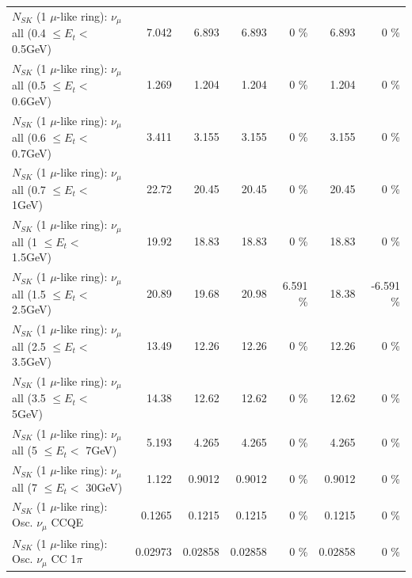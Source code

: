 \begin{table}
\begin{tabular}{| l | r | r | r  r | r  r |}
       $N_{SK}$ (1 $\mu$-like ring): $\nu_{\mu}$ all (0.4 $\leq E_{t} <$ 0.5GeV) &           7.042 &           6.893 &           6.893 &        0 \%  &           6.893 &        0 \%  \\ 
       $N_{SK}$ (1 $\mu$-like ring): $\nu_{\mu}$ all (0.5 $\leq E_{t} <$ 0.6GeV) &           1.269 &           1.204 &           1.204 &        0 \%  &           1.204 &        0 \%  \\ 
       $N_{SK}$ (1 $\mu$-like ring): $\nu_{\mu}$ all (0.6 $\leq E_{t} <$ 0.7GeV) &           3.411 &           3.155 &           3.155 &        0 \%  &           3.155 &        0 \%  \\ 
         $N_{SK}$ (1 $\mu$-like ring): $\nu_{\mu}$ all (0.7 $\leq E_{t} <$ 1GeV) &           22.72 &           20.45 &           20.45 &        0 \%  &           20.45 &        0 \%  \\ 
         $N_{SK}$ (1 $\mu$-like ring): $\nu_{\mu}$ all (1 $\leq E_{t} <$ 1.5GeV) &           19.92 &           18.83 &           18.83 &        0 \%  &           18.83 &        0 \%  \\ 
       $N_{SK}$ (1 $\mu$-like ring): $\nu_{\mu}$ all (1.5 $\leq E_{t} <$ 2.5GeV) &           20.89 &           19.68 &           20.98 &    6.591 \%  &           18.38 &   -6.591 \%  \\ 
       $N_{SK}$ (1 $\mu$-like ring): $\nu_{\mu}$ all (2.5 $\leq E_{t} <$ 3.5GeV) &           13.49 &           12.26 &           12.26 &        0 \%  &           12.26 &        0 \%  \\ 
         $N_{SK}$ (1 $\mu$-like ring): $\nu_{\mu}$ all (3.5 $\leq E_{t} <$ 5GeV) &           14.38 &           12.62 &           12.62 &        0 \%  &           12.62 &        0 \%  \\ 
           $N_{SK}$ (1 $\mu$-like ring): $\nu_{\mu}$ all (5 $\leq E_{t} <$ 7GeV) &           5.193 &           4.265 &           4.265 &        0 \%  &           4.265 &        0 \%  \\ 
          $N_{SK}$ (1 $\mu$-like ring): $\nu_{\mu}$ all (7 $\leq E_{t} <$ 30GeV) &           1.122 &          0.9012 &          0.9012 &        0 \%  &          0.9012 &        0 \%  \\ 
\hline
\hline
                               $N_{SK}$ (1 $\mu$-like ring): Osc. $\nu_\mu$ CCQE &          0.1265 &          0.1215 &          0.1215 &        0 \%  &          0.1215 &        0 \%  \\ 
                          $N_{SK}$ (1 $\mu$-like ring): Osc. $\nu_\mu$ CC 1$\pi$ &         0.02973 &         0.02858 &         0.02858 &        0 \%  &         0.02858 &        0 \%  \\ 

\end{tabular}
\end{table}
